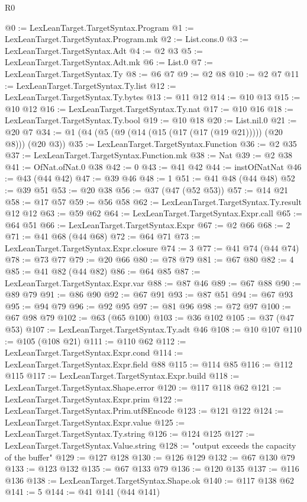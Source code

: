 \begin{lexlean}{R0}
\begin{coremodule}
@0 := LexLeanTarget.TargetSyntax.Program
@1 := LexLeanTarget.TargetSyntax.Program.mk
@2 := List.cons.{0}
@3 := LexLeanTarget.TargetSyntax.Adt
@4 := @2 @3
@5 := LexLeanTarget.TargetSyntax.Adt.mk
@6 := List.{0}
@7 := LexLeanTarget.TargetSyntax.Ty
@8 := @6 @7
@9 := @2 @8
@10 := @2 @7
@11 := LexLeanTarget.TargetSyntax.Ty.list
@12 := LexLeanTarget.TargetSyntax.Ty.bytes
@13 := @11 @12
@14 := @10 @13
@15 := @10 @12
@16 := LexLeanTarget.TargetSyntax.Ty.nat
@17 := @10 @16
@18 := LexLeanTarget.TargetSyntax.Ty.bool
@19 := @10 @18
@20 := List.nil.{0}
@21 := @20 @7
@34 := @1 (@4 (@5 (@9 (@14 (@15 (@17 (@17 (@19 @21))))) (@20 @8))) (@20 @3))
@35 := LexLeanTarget.TargetSyntax.Function
@36 := @2 @35
@37 := LexLeanTarget.TargetSyntax.Function.mk
@38 := Nat
@39 := @2 @38
@41 := OfNat.ofNat.{0} @38
@42 := 0
@43 := @41 @42
@44 := instOfNatNat
@46 := @43 (@44 @42)
@47 := @39 @46
@48 := 1
@51 := @41 @48 (@44 @48)
@52 := @39 @51
@53 := @20 @38
@56 := @37 (@47 (@52 @53))
@57 := @14 @21
@58 := @17 @57
@59 := @56 @58
@62 := LexLeanTarget.TargetSyntax.Ty.result @12 @12
@63 := @59 @62
@64 := LexLeanTarget.TargetSyntax.Expr.call
@65 := @64 @51
@66 := LexLeanTarget.TargetSyntax.Expr
@67 := @2 @66
@68 := 2
@71 := @41 @68 (@44 @68)
@72 := @64 @71
@73 := LexLeanTarget.TargetSyntax.Expr.closure
@74 := 3
@77 := @41 @74 (@44 @74)
@78 := @73 @77
@79 := @20 @66
@80 := @78 @79
@81 := @67 @80
@82 := 4
@85 := @41 @82 (@44 @82)
@86 := @64 @85
@87 := LexLeanTarget.TargetSyntax.Expr.var
@88 := @87 @46
@89 := @67 @88
@90 := @89 @79
@91 := @86 @90
@92 := @67 @91
@93 := @87 @51
@94 := @67 @93
@95 := @94 @79
@96 := @92 @95
@97 := @81 @96
@98 := @72 @97
@100 := @67 @98 @79
@102 := @63 (@65 @100)
@103 := @36 @102
@105 := @37 (@47 @53)
@107 := LexLeanTarget.TargetSyntax.Ty.adt @46
@108 := @10 @107
@110 := @105 (@108 @21)
@111 := @110 @62
@112 := LexLeanTarget.TargetSyntax.Expr.cond
@114 := LexLeanTarget.TargetSyntax.Expr.field @88
@115 := @114 @85
@116 := @112 @115
@117 := LexLeanTarget.TargetSyntax.Expr.build
@118 := LexLeanTarget.TargetSyntax.Shape.error
@120 := @117 @118 @62
@121 := LexLeanTarget.TargetSyntax.Expr.prim
@122 := LexLeanTarget.TargetSyntax.Prim.utf8Encode
@123 := @121 @122
@124 := LexLeanTarget.TargetSyntax.Expr.value
@125 := LexLeanTarget.TargetSyntax.Ty.string
@126 := @124 @125
@127 := LexLeanTarget.TargetSyntax.Value.string
@128 := "output exceeds the capacity of the buffer"
@129 := @127 @128
@130 := @126 @129
@132 := @67 @130 @79
@133 := @123 @132
@135 := @67 @133 @79
@136 := @120 @135
@137 := @116 @136
@138 := LexLeanTarget.TargetSyntax.Shape.ok
@140 := @117 @138 @62
@141 := 5
@144 := @41 @141 (@44 @141)

\end{coremodule}
\end{lexlean}
